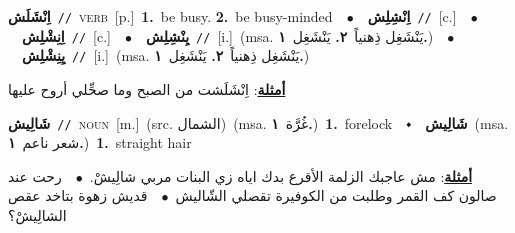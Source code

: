 \documentclass[10pt,a4paper,twoside]{article} %
\begin{document}
\begin{multicols}{2}
{\setlength\topsep{0pt}\textbf{\foreignlanguage{arabic}{اِنْشَلَش}}\ {\color{gray}\texttt{//}\color{black}}\ \textsc{verb}\ [p.]\ \textbf{1.}~be busy.  \textbf{2.}~be busy-minded\ \ $\bullet$\ \ \setlength\topsep{0pt}\textbf{\foreignlanguage{arabic}{اِنْشِلِش}}\ {\color{gray}\texttt{//}\color{black}}\ [c.]\ \ $\bullet$\ \ \setlength\topsep{0pt}\textbf{\foreignlanguage{arabic}{اِنِشْلِش}}\ {\color{gray}\texttt{//}\color{black}}\ [c.]\ \ $\bullet$\ \ \setlength\topsep{0pt}\textbf{\foreignlanguage{arabic}{يِنْشِلِش}}\ {\color{gray}\texttt{//}\color{black}}\ [i.]\ \color{gray}(msa. \foreignlanguage{arabic}{يَنْشَغِل ذِهنياً}~\foreignlanguage{arabic}{\textbf{٢.}}  \foreignlanguage{arabic}{يَنْشَغِل}~\foreignlanguage{arabic}{\textbf{١.}})\color{black}\ \ $\bullet$\ \ \setlength\topsep{0pt}\textbf{\foreignlanguage{arabic}{يِنِشْلِش}}\ {\color{gray}\texttt{//}\color{black}}\ [i.]\ \color{gray}(msa. \foreignlanguage{arabic}{يَنْشَغِل ذِهنياً}~\foreignlanguage{arabic}{\textbf{٢.}}  \foreignlanguage{arabic}{يَنْشَغِل}~\foreignlanguage{arabic}{\textbf{١.}})\color{black}\  \begin{flushright}\color{gray}\foreignlanguage{arabic}{\textbf{\underline{\foreignlanguage{arabic}{أمثلة}}}: اِنْشَلَشت من الصبح وما صحِّلي أروح عليها}\end{flushright}\color{black}} \vspace{2mm}

{\setlength\topsep{0pt}\textbf{\foreignlanguage{arabic}{شَالِيش}}\ {\color{gray}\texttt{//}\color{black}}\ \textsc{noun}\ [m.]\ (src. \color{gray}\foreignlanguage{arabic}{الشمال}\color{black})\ \color{gray}(msa. \foreignlanguage{arabic}{غُرَّة}~\foreignlanguage{arabic}{\textbf{١.}})\color{black}\ \textbf{1.}~forelock\ \ $\smblkdiamond$\ \ \setlength\topsep{0pt}\textbf{\foreignlanguage{arabic}{شَالِيش}}\ \color{gray}(msa. \foreignlanguage{arabic}{شعر ناعم}~\foreignlanguage{arabic}{\textbf{١.}})\color{black}\ \textbf{1.}~straight hair\  \begin{flushright}\color{gray}\foreignlanguage{arabic}{\textbf{\underline{\foreignlanguage{arabic}{أمثلة}}}: مش عاجبك الزلمة الأقرع بدك اياه زي البنات مربي شالِيشْ.\ $\bullet$\ \  رحت عند صالون كف القمر وطلبت من الكوفيرة تقصلي الشّاليش\ $\bullet$\ \  قديش زهوة بتاخد عقص الشالِيشْ؟}\end{flushright}\color{black}} \vspace{2mm}


\end{multicols}
\end{document}
